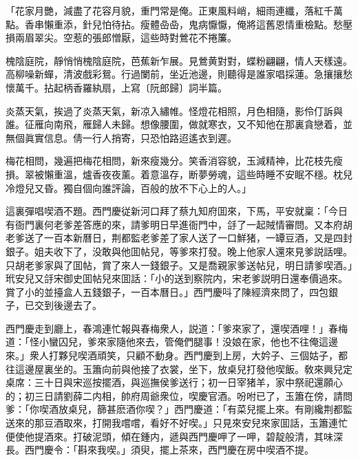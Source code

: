 \begin{myquote}
「花家月艷，減盡了花容月貌，重門常是俺。正東風料峭，細雨連纖，落紅千萬點。香串懶重添，針兒怕待拈。瘦體喦喦，鬼病懨懨，俺將這舊恩情重檢點。愁壓損兩眉翠尖。空惹的張郎憎厭，這些時對鶯花不捲簾。

槐陰庭院，靜悄悄槐陰庭院，芭蕉新乍展。見鶯黄對對，蝶粉翩翩，情人天樣遠。高柳噪新蟬，清波戲彩鴛。行過闌前，坐近池邊，則聽得是誰家唱採蓮。急攘攘愁懷萬千。拈起柄香羅紈扇，上寫〔阮郎歸〕詞半篇。

炎蒸天氣，挨過了炎蒸天氣，新凉入繡帷。怪燈花相照，月色相隨，影伶仃訴與誰。征雁向南飛，雁歸人未歸。想像腰圍，做就寒衣，又不知他在那裏貪戀着，並無個眞實信息。倩一行人捎寄，只恐怕路迢遙衣到遲。

梅花相問，幾遍把梅花相問，新來瘦幾分。笑香消容貌，玉減精神，比花枝先瘦損。翠被懶重溫，爐香夜夜薰。着意溫存，断夢勞魂，這些時睡不安眠不穩。枕兒冷燈兒又昏。獨自個向誰評論，百般的放不下心上的人。」
\end{myquote}

這裏彈唱喫酒不題。西門慶従新河口拜了蔡九知府囬來，下馬，平安就稟：「今日有衙門裏何老爹差答應的來，請爹明日早進衙門中，㧱了一起賊情審問。又本府胡老爹送了一百本新曆日，荆都監老爹差了家人送了一口鮮猪，一罈豆酒，又是四封銀子。姐夫收下了，没敢與他囬帖兒，等爹來打發。晚上他家人還來見爹説話哩。只胡老爹家與了囬帖，賞了來人一錢銀子。又是喬親家爹送帖兒，明日請爹喫酒。」玳安兒又㧱宋御史囬帖兒來囬話：「小的送到察院内，宋老爹説明日還奉價過來。賞了小的並擡盒人五錢銀子，一百本曆日。」西門慶呌了陳經濟來問了，四包銀子，已交到後邊去了。

西門慶走到廳上，春鴻連忙報與春梅衆人，説道：「爹來家了，還喫酒哩！」春梅道：「怪小蠻囚兒，爹來家隨他來去，管俺們腿事！没娘在家，他也不往俺這邊來。」衆人打夥兒喫酒頑笑，只顧不動身。西門慶到上房，大妗子、三個姑子，都往這邊屋裏坐的。玉簫向前與他接了衣裳，坐下，放桌兒打發他喫飯。敎來興兒定桌席：三十日與宋巡按擺酒，與巡撫侯爹送行；初一日宰猪羊，家中祭祀還願心的；初三日請劉薛二内相，帥府周爺衆位，喫慶官酒。吩咐已了，玉簫在傍，請問爹：「你喫酒放桌兒，篩甚麽酒你喫？」西門慶道：「有菜兒擺上來。有剛纔荆都監送來的那豆酒取來，打開我嚐嚐，看好不好喫。」只見來安兒來家囬話，玉簫連忙便使他提酒來。打破泥頭，傾在鍾内，遞與西門慶呷了一呷，碧靛般清，其味深長。西門慶令：「斟來我喫。」須臾，擺上茶來，西門慶在房中喫酒不提。

